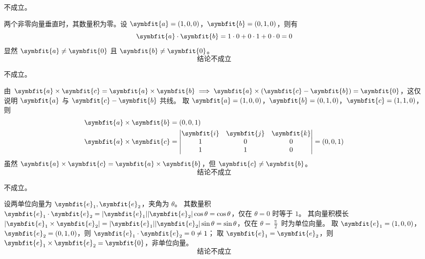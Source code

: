 \begin{solution}
     不成立。

    两个非零向量垂直时，其数量积为零。设 $\symbfit{a} = (1, 0, 0)$，$\symbfit{b} = (0, 1, 0)$，则有
    \begin{equation}
        \symbfit{a} \cdot \symbfit{b} = 1 \cdot 0 + 0 \cdot 1 + 0 \cdot 0 = 0
    \end{equation}
    显然 $\symbfit{a} \neq \symbfit{0}$ 且 $\symbfit{b} \neq \symbfit{0}$。
    \begin{equation}
        \boxed{\text{结论不成立}}
    \end{equation}

     不成立。

    由 $\symbfit{a} \times \symbfit{c} = \symbfit{a} \times \symbfit{b} \implies \symbfit{a} \times (\symbfit{c} - \symbfit{b}) = \symbfit{0}$，这仅说明 $\symbfit{a}$ 与 $\symbfit{c} - \symbfit{b}$ 共线。
    取 $\symbfit{a} = (1, 0, 0)$，$\symbfit{b} = (0, 1, 0)$，$\symbfit{c} = (1, 1, 0)$，则
    \begin{equation}
        \begin{aligned}
            \symbfit{a} \times \symbfit{b} & = (0, 0, 1)                                                                                                   \\
            \symbfit{a} \times \symbfit{c} & = \begin{vmatrix} \symbfit{i} & \symbfit{j} & \symbfit{k} \\ 1 & 0 & 0 \\ 1 & 1 & 0 \end{vmatrix} = (0, 0, 1)
        \end{aligned}
    \end{equation}
    虽然 $\symbfit{a} \times \symbfit{c} = \symbfit{a} \times \symbfit{b}$，但 $\symbfit{c} \neq \symbfit{b}$。
    \begin{equation}
        \boxed{\text{结论不成立}}
    \end{equation}

     不成立。

    设两单位向量为 $\symbfit{e}_1, \symbfit{e}_2$，夹角为 $\theta$。
    其数量积 $\symbfit{e}_1 \cdot \symbfit{e}_2 = |\symbfit{e}_1||\symbfit{e}_2|\cos\theta = \cos\theta$，仅在 $\theta = 0$ 时等于 $1$。
    其向量积模长 $|\symbfit{e}_1 \times \symbfit{e}_2| = |\symbfit{e}_1||\symbfit{e}_2|\sin\theta = \sin\theta$，仅在 $\theta = \frac{\uppi}{2}$ 时为单位向量。
    取 $\symbfit{e}_1 = (1, 0, 0)$，$\symbfit{e}_2 = (0, 1, 0)$，则 $\symbfit{e}_1 \cdot \symbfit{e}_2 = 0 \neq 1$；
    取 $\symbfit{e}_1 = \symbfit{e}_2$，则 $\symbfit{e}_1 \times \symbfit{e}_2 = \symbfit{0}$，非单位向量。
    \begin{equation}
        \boxed{\text{结论不成立}}
    \end{equation}


\end{solution}
